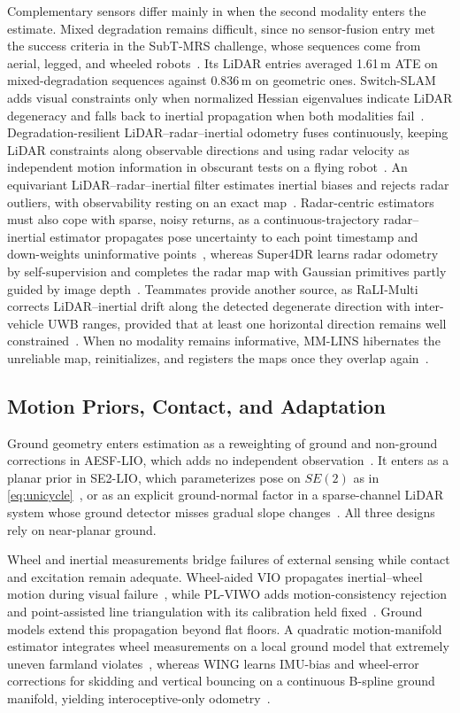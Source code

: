 Complementary sensors differ mainly in when the second modality enters the estimate. Mixed degradation remains difficult, since no sensor-fusion entry met the success criteria in the SubT-MRS challenge, whose sequences come from aerial, legged, and wheeled robots~\cite{P_K01}. Its LiDAR entries averaged 1.61\,m ATE on mixed-degradation sequences against 0.836\,m on geometric ones. Switch-SLAM adds visual constraints only when normalized Hessian eigenvalues indicate LiDAR degeneracy and falls back to inertial propagation when both modalities fail~\cite{P_F04}. Degradation-resilient LiDAR--radar--inertial odometry fuses continuously, keeping LiDAR constraints along observable directions and using radar velocity as independent motion information in obscurant tests on a flying robot~\cite{P_E09}. An equivariant LiDAR--radar--inertial filter estimates inertial biases and rejects radar outliers, with observability resting on an exact map~\cite{P_E06}. Radar-centric estimators must also cope with sparse, noisy returns, as a continuous-trajectory radar--inertial estimator propagates pose uncertainty to each point timestamp and down-weights uninformative points~\cite{P_R01}, whereas Super4DR learns radar odometry by self-supervision and completes the radar map with Gaussian primitives partly guided by image depth~\cite{P_R12}. Teammates provide another source, as RaLI-Multi corrects LiDAR--inertial drift along the detected degenerate direction with inter-vehicle UWB ranges, provided that at least one horizontal direction remains well constrained~\cite{P_R02}. When no modality remains informative, MM-LINS hibernates the unreliable map, reinitializes, and registers the maps once they overlap again~\cite{P_E08}.

\subsection{Motion Priors, Contact, and Adaptation}

Ground geometry enters estimation as a reweighting of ground and non-ground corrections in AESF-LIO, which adds no independent observation~\cite{P_N01}. It enters as a planar prior in SE2-LIO, which parameterizes pose on $SE(2)$ as in \eqref{eq:unicycle}~\cite{P_N02}, or as an explicit ground-normal factor in a sparse-channel LiDAR system whose ground detector misses gradual slope changes~\cite{P_R03}. All three designs rely on near-planar ground.

Wheel and inertial measurements bridge failures of external sensing while contact and excitation remain adequate. Wheel-aided VIO propagates inertial--wheel motion during visual failure~\cite{P_M24}, while PL-VIWO adds motion-consistency rejection and point-assisted line triangulation with its calibration held fixed~\cite{P_E10}. Ground models extend this propagation beyond flat floors. A quadratic motion-manifold estimator integrates wheel measurements on a local ground model that extremely uneven farmland violates~\cite{P_M43}, whereas WING learns IMU-bias and wheel-error corrections for skidding and vertical bouncing on a continuous B-spline ground manifold, yielding interoceptive-only odometry~\cite{P_R04}.


